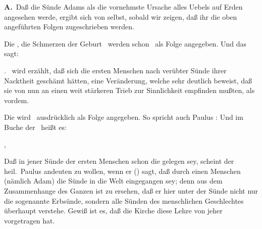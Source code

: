 \vabst \textbf{A.}~Daß die Sünde Adams als die vornehmste Ursache alles Uebels auf Erden angesehen werde, ergibt sich von selbst, sobald wir zeigen, daß ihr die oben angeführten Folgen zugeschrieben werden.
\begin{aufza}
\item Die , die Schmerzen der Geburt \usw\ werden schon \ als Folge angegeben. Und das  sagt: 
\item {}. \ wird erzählt, daß sich die ersten Menschen nach verübter Sünde ihrer Nacktheit geschämt hätten, eine Veränderung, welche sehr deutlich beweist, daß sie von nun an einen weit stärkeren Trieb zur Sinnlichkeit empfinden mußten, als vordem.
\item Die  wird \ ausdrücklich als Folge angegeben. So spricht auch Paulus :  Und im Buche der \ heißt es: 
\item {}, \usw\ \ 
\item Daß in jener Sünde der ersten Menschen schon die  gelegen sey, scheint der heil.\ Paulus andeuten zu wollen, wenn er () sagt, daß durch einen Menschen (nämlich Adam) die Sünde in die Welt eingegangen sey; denn aus dem Zusammenhange des Ganzen ist zu ersehen, daß er hier unter der Sünde nicht nur die sogenannte Erbsünde, sondern alle Sünden des menschlichen Geschlechtes überhaupt verstehe. Gewiß ist es, daß die Kirche diese Lehre von jeher vorgetragen hat.
\end{aufza}\par

